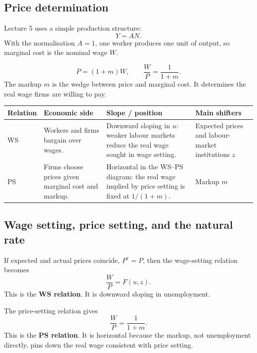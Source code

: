 \subsection{Price determination}

Lecture 5 uses a simple production structure:
\[
Y=AN.
\]
With the normalisation $A=1$, one worker produces one unit of output, so marginal cost is the nominal wage $W$.

\begin{keyformula}[title={Key Formula: Price-setting relation}]
\[
P=(1+m)W,
\qquad
\frac{W}{P}=\frac{1}{1+m}.
\]
The markup $m$ is the wedge between price and marginal cost. It determines the real wage firms are willing to pay.
\end{keyformula}

\begin{center}
\renewcommand{\arraystretch}{1.2}
\begin{tabularx}{\textwidth}{|p{2.2cm}|X|X|X|}
\hline
\textbf{Relation} & \textbf{Economic side} & \textbf{Slope / position} & \textbf{Main shifters} \\
\hline
WS & Workers and firms bargain over wages. & Downward sloping in $u$: weaker labour markets reduce the real wage sought in wage setting. & Expected prices and labour-market institutions $z$ \\
\hline
PS & Firms choose prices given marginal cost and markup. & Horizontal in the WS--PS diagram: the real wage implied by price setting is fixed at $1/(1+m)$. & Markup $m$ \\
\hline
\end{tabularx}
\end{center}

\subsection{Wage setting, price setting, and the natural rate}

If expected and actual prices coincide, $P^e=P$, then the wage-setting relation becomes
\[
\frac{W}{P}=F(u,z).
\]
This is the \textbf{WS relation}. It is downward sloping in unemployment.

The price-setting relation gives
\[
\frac{W}{P}=\frac{1}{1+m}.
\]
This is the \textbf{PS relation}. It is horizontal because the markup, not unemployment directly, pins down the real wage consistent with price setting.

